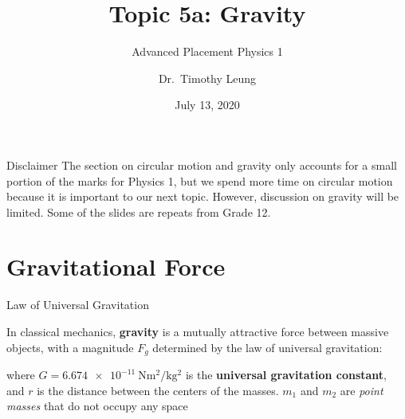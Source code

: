 \documentclass[12pt,compress,aspectratio=169]{beamer}
\title{Topic 5a: Gravity}
\subtitle{Advanced Placement Physics 1}
\author{Dr.\ Timothy Leung}
\institute{Olympiads School\\Toronto, Ontario, Canada}
\date{July 13, 2020}
\newcommand{\mb}[1]{\ensuremath\mathbf{#1}}
\newcommand{\eq}[2]{\vspace{#1}{\Large\begin{displaymath}#2\end{displaymath}}}
\begin{document}
\begin{frame}
  \maketitle
\end{frame}



\begin{frame}{Disclaimer}
  The section on circular motion and gravity only accounts for a small portion
  of the marks for Physics 1, but we spend more time on circular motion because
  it is important to our next topic. However, discussion on gravity will be
  limited. Some of the slides are repeats from Grade 12.
\end{frame}


\section{Gravitational Force}


\begin{frame}{Law of Universal Gravitation}
  \begin{center}
  \end{center}

  In classical mechanics, \textbf{gravity} is a mutually attractive force
  between massive objects, with a magnitude $F_g$ determined by the law of
  universal gravitation:

  \eq{-.2in}{
    \boxed{
      F_g=G\frac{m_1m_2}{r^2}
    }
  }

  where $G=\SI{6.674e-11}{\newton\metre\squared\per\kilo\gram\squared}$ is the \textbf{universal gravitation
    constant}, and $r$ is the distance between the centers of the masses.
  $m_1$ and $m_2$ are \emph{point masses} that do not occupy any space
\end{frame}
\end{document}
